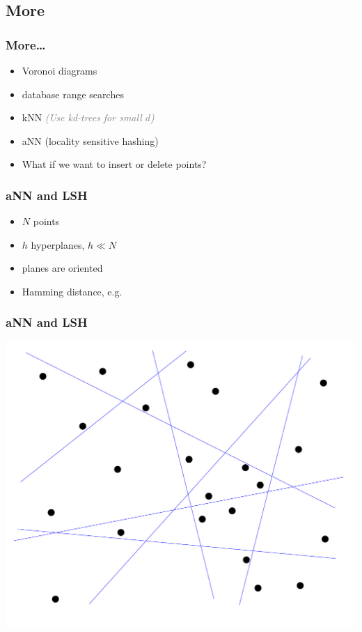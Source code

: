 \documentclass{beamer}
\newcommand\smallgray[1]{\textcolor{gray}{\small\it #1}}
\begin{document}
\subsection{More}

\begin{frame}
  \frametitle{More\dots}
  \begin{itemize}
  \item Voronoi diagrams
  \item database range searches
  \item kNN \smallgray{\small\it (Use kd-trees for small $d$)}
  \item aNN (locality sensitive hashing)
  \item What if we want to insert or delete points?
  \end{itemize}
\end{frame}

\begin{frame}
  \frametitle{aNN and LSH}

  \begin{itemize}
  \item $N$ points
  \item $h$ hyperplanes, $h \ll N$
  \item planes are oriented
  \item Hamming distance, e.g.
  \end{itemize}
\end{frame}

\begin{frame}
  \frametitle{aNN and LSH}

  \includegraphics[width=\textwidth]{LSH.pdf}
\end{frame}
\end{document}
